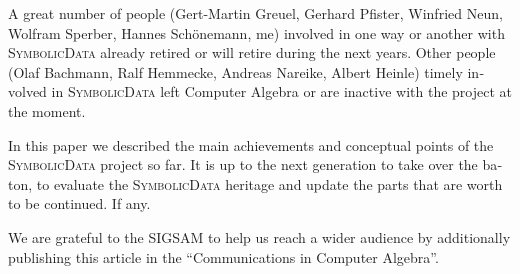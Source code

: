 \documentclass[11pt]{article}
\def\SD{\textsc{SymbolicData}}
\begin{document}
\begin{otherlanguage}{english}
\begin{multicols}{2}
A great number of people (Gert-Martin Greuel, Gerhard Pfister, Winfried Neun,
Wolfram Sperber, Hannes Schöne\-mann, me) involved in one way or another with
{\SD} already retired or will retire during the next years.  Other people (Olaf
Bachmann, Ralf Hemmecke, Andreas Nareike, Albert Heinle) timely involved in
{\SD} left Computer Algebra or are inactive with the project at the moment.

In this paper we described the main achievements and conceptual points of the
{\SD} project so far.  It is up to the next generation to take over the baton,
to evaluate the {\SD} heritage and update the parts that are worth to be
continued. If any.


We are grateful to the SIGSAM to help us reach a wider audience by additionally
publishing this article in the ``Communications in Computer Algebra''.



\end{multicols}
\end{otherlanguage}
\end{document}
